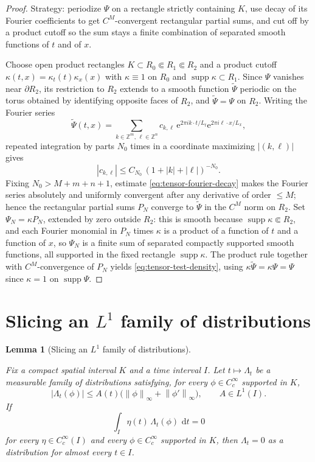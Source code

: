 \documentclass[11pt,oneside]{book}
\providecommand{\uses}[1]{}
\newtheorem{lemma}[theorem]{Lemma}
\theoremstyle{definition}
\theoremstyle{remark}
\newcommand{\Z}{\mathbb Z}
\newcommand{\supp}{\operatorname{supp}}
\newcommand{\1}{\mathbf 1}
\newcommand{\dd}{\,\mathrm d}
\newcommand{\norm}[1]{\left\lVert #1\right\rVert}
\newcommand{\abs}[1]{\left\lvert #1\right\rvert}
\newcommand{\e}{\mathrm e}
\begin{document}
\begin{proof}
Strategy: periodize $\Psi$ on a rectangle strictly containing $K$, use decay
of its Fourier coefficients to get $C^M$-convergent rectangular partial sums,
and cut off by a product cutoff so the sum stays a finite combination of
separated smooth functions of $t$ and of $x$.

Choose open product rectangles $K\subset R_0\Subset R_1\Subset R_2$ and a
product cutoff $\kappa(t,x)=\kappa_t(t)\kappa_x(x)$ with $\kappa\equiv1$ on
$R_0$ and $\supp\kappa\subset R_1$. Since $\Psi$ vanishes near
$\partial R_2$, its restriction to $R_2$ extends to a smooth function
$\widetilde\Psi$ periodic on the torus obtained by identifying opposite faces
of $R_2$, and $\widetilde\Psi=\Psi$ on $R_2$. Writing the Fourier series
\[
 \widetilde\Psi(t,x)
 =\sum_{k\in\Z^m,\,\ell\in\Z^n}
 c_{k,\ell}\,\e^{2\pi i k\cdot t/L_t}\e^{2\pi i\ell\cdot x/L_x},
\]
repeated integration by parts $N_0$ times in a coordinate maximizing
$\abs{(k,\ell)}$ gives
\begin{equation}
 \abs{c_{k,\ell}}
 \le C_{N_0}\,(1+\abs{k}+\abs{\ell})^{-N_0}.
 \label{eq:tensor-fourier-decay}
\end{equation}
Fixing $N_0>M+m+n+1$, estimate \eqref{eq:tensor-fourier-decay} makes the
Fourier series absolutely and uniformly convergent after any derivative of
order $\le M$; hence the rectangular partial sums $P_N$ converge to
$\widetilde\Psi$ in the $C^M$ norm on $R_2$. Set $\Psi_N=\kappa P_N$,
extended by zero outside $R_2$: this is smooth because $\supp\kappa\Subset R_2$,
and each Fourier monomial in $P_N$ times $\kappa$ is a product of a function of
$t$ and a function of $x$, so $\Psi_N$ is a finite sum of separated compactly
supported smooth functions, all supported in the fixed rectangle $\supp\kappa$.
The product rule together with $C^M$-convergence of $P_N$ yields
\eqref{eq:tensor-test-density}, using $\kappa\widetilde\Psi=\kappa\Psi=\Psi$
since $\kappa=1$ on $\supp\Psi$.
\end{proof}

\section{Slicing an $L^1$ family of distributions}

\begin{lemma}[Slicing an $L^1$ family of distributions]
\label{lem:distribution-slicing}
\uses{lem:tensor-test-density}
Fix a compact spatial interval $K$ and a time interval $I$. Let
$t\mapsto\Lambda_t$ be a measurable family of distributions satisfying, for
every $\phi\in C_c^\infty$ supported in $K$,
\[
 \abs{\Lambda_t(\phi)}\le A(t)\bigl(\norm\phi_\infty+\norm{\phi'}_\infty\bigr),
 \qquad A\in L^1(I).
\]
If
\[
 \int_I\eta(t)\,\Lambda_t(\phi)\,\dd t=0
\]
for every $\eta\in C_c^\infty(I)$ and every $\phi\in C_c^\infty$ supported in
$K$, then $\Lambda_t=0$ as a distribution for almost every $t\in I$.
\end{lemma}
\end{document}
